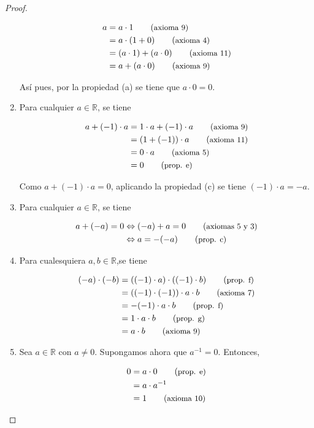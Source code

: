 \documentclass[
  a4paper,
]{scrreport}
\theoremstyle{definition}
\theoremstyle{plain}
\theoremstyle{definition}
\theoremstyle{definition}
\theoremstyle{plain}
\theoremstyle{plain}
\theoremstyle{remark}
\begin{document}
\begin{tcolorbox}
\begin{proof}
\begin{enumerate}
  \begin{align*}
   a &= a\cdot 1 \tag{\small{axioma 9}}\\
   &= a\cdot (1+0) \tag{\small{axioma 4}}\\
   &= (a\cdot 1) + (a\cdot 0) \tag{\small{axioma 11}}\\
   &= a + (a\cdot 0) \tag{\small{axioma 9}}
   \end{align*}

  Así pues, por la propiedad (a) se tiene que \(a\cdot 0 =0\).
\item
  Para cualquier \(a\in\mathbb{R}\), se tiene

  \begin{align*}
   a+(-1)\cdot a &= 1\cdot a + (-1)\cdot a \tag{\small{axioma 9}} \\ 
   &= (1+(-1))\cdot a \tag{\small{axioma 11}}\\ 
   &= 0\cdot a \tag{\small{axioma 5}}\\ 
   &= 0 \tag{\small{prop. e}}
   \end{align*}

  Como \(a+(-1)\cdot a=0\), aplicando la propiedad (c) se tiene
  \((-1)\cdot a = -a\).
\item
  Para cualquier \(a\in\mathbb{R}\), se tiene

  \begin{align*}
   a+(-a)=0 & \Leftrightarrow (-a)+a=0 \tag{\small{axiomas 5 y 3}} \\ 
   &\Leftrightarrow a=-(-a)\tag{\small{prop. c}}
   \end{align*}
\item
  Para cualesquiera \(a,b\in\mathbb{R}\),se tiene

  \begin{align*}
   (-a)\cdot (-b)&=((-1)\cdot a)\cdot ((-1)\cdot b) \tag{\small{prop. f}}\\ 
   &= ((-1)\cdot(-1))\cdot a\cdot  b\tag{\small{axioma 7}}\\ 
   &= -(-1)\cdot a\cdot b \tag{\small{prop. f}}\\ 
   &= 1\cdot a\cdot b \tag{\small{prop. g}} \\
   &= a\cdot b \tag{\small{axioma 9}}
   \end{align*}
\item
  Sea \(a\in \mathbb{R}\) con \(a\neq 0\). Supongamos ahora que
  \(a^{-1}=0\). Entonces,

  \begin{align*}
   0 &= a\cdot 0 \tag{\small{prop. e}}\\ 
   &= a\cdot a^{-1} \\
   &= 1 \tag{\small{axioma 10}}
   \end{align*}


\end{enumerate}
\end{proof}
\end{tcolorbox}
\end{document}
